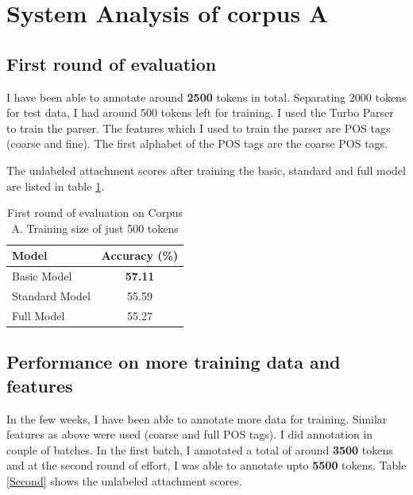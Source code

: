 \documentclass[11pt,letterpaper]{article}
\begin{document}
\section{System Analysis of corpus A}

\subsection{First round of evaluation}
I have been able to annotate around \textbf{2500} tokens in total. Separating 2000 tokens for test data, I had around 500 tokens left for training. I used the Turbo Parser \citep{MSXAF10} to train the parser. The features which I used to train the parser are POS tags (coarse and fine). The first alphabet of the POS tags are the coarse POS tags.

 The unlabeled attachment scores after training the basic, standard and full model are listed in table \ref{First}.
\begin{table}
\begin{center}
  \begin{tabular}{ l || c }
  \hline
  Model & Accuracy (\%)\\
  \hline
  Basic Model & \textbf{57.11} \\
  Standard Model & 55.59 \\
  Full Model & 55.27 \\
  \hline
   \end{tabular}
\end{center}
\caption{First round of evaluation on Corpus A. Training size of just 500 tokens}
\label{First}
\end{table}


\subsection{Performance on more training data and features}
In the few weeks, I have been able to annotate more data for training. Similar features as above were used (coarse and full POS tags). I did annotation in couple of batches. In the first batch, I annotated a total of around \textbf{3500} tokens and at the second round of effort, I was able to annotate upto \textbf{5500} tokens. Table \ref{Second} shows the unlabeled attachment scores. \\
\end{document}
